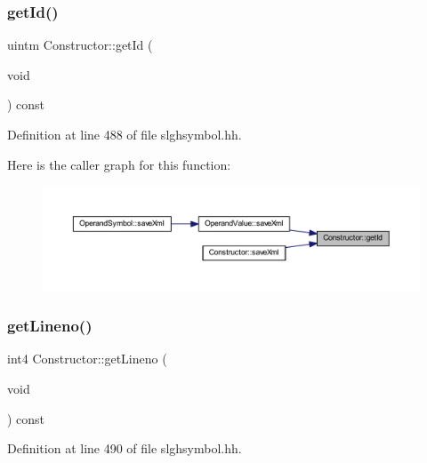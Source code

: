 \subsubsection{\texorpdfstring{getId()}{getId()}}
{\footnotesize\ttfamily uintm Constructor\+::get\+Id (\begin{DoxyParamCaption}\item[{void}]{ }\end{DoxyParamCaption}) const\hspace{0.3cm}{\ttfamily [inline]}}



Definition at line 488 of file slghsymbol.\+hh.

Here is the caller graph for this function\+:
\nopagebreak
\begin{figure}[H]
\begin{center}
\leavevmode
\includegraphics[width=350pt]{class_constructor_aacdb7792f4b1b7cb3e2ed2ce18ad48e8_icgraph}
\end{center}
\end{figure}
\mbox{\label{class_constructor_a0cbe5257839b6cebe5c820a634f6b9ed}} 
\subsubsection{\texorpdfstring{getLineno()}{getLineno()}}
{\footnotesize\ttfamily int4 Constructor\+::get\+Lineno (\begin{DoxyParamCaption}\item[{void}]{ }\end{DoxyParamCaption}) const\hspace{0.3cm}{\ttfamily [inline]}}



Definition at line 490 of file slghsymbol.\+hh.

\mbox{\label{class_constructor_a577c1bfb784dc0db4be055dad2155ad5}} 
